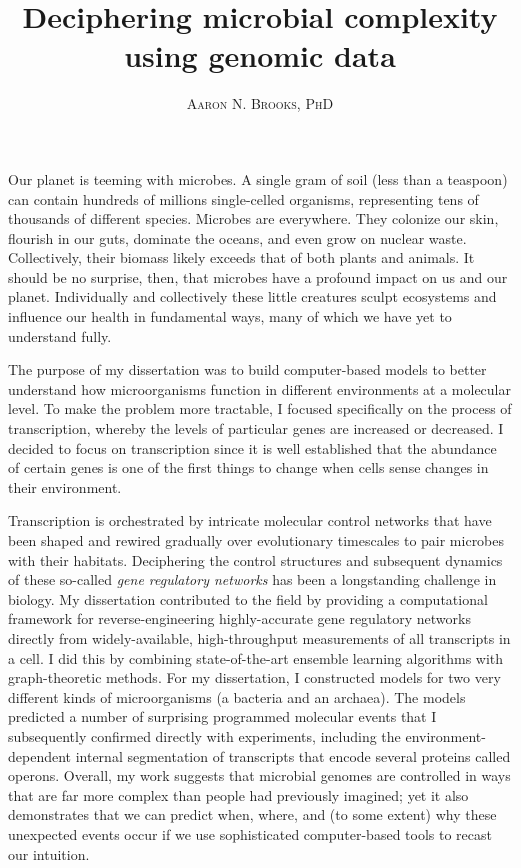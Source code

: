 \documentclass{article}
\title{\vspace{-15mm}\fontsize{20pt}{10pt}\selectfont\textbf{Deciphering microbial complexity using genomic data}} %
\author{
\large
{\textsc{ Aaron N. Brooks, PhD }}\\[0.1mm]
}
\date{}
\begin{document}
\maketitle %
\thispagestyle{fancy} %

Our planet is teeming with microbes. A single gram of soil (less than a teaspoon) can contain hundreds of millions single-celled organisms, representing tens of thousands of different species. Microbes are everywhere. They colonize our skin, flourish in our guts, dominate the oceans, and even grow on nuclear waste. Collectively, their biomass likely exceeds that of both plants and animals. It should be no surprise, then, that microbes have a profound impact on us and our planet. Individually and collectively these little creatures sculpt ecosystems and influence our health in fundamental ways, many of which we have yet to understand fully. 

The purpose of my dissertation was to build computer-based models to better understand how microorganisms function in different environments at a molecular level. To make the problem more tractable, I focused specifically on the process of transcription, whereby the levels of particular genes are increased or decreased. I decided to focus on transcription since it is well established that the abundance of certain genes is one of the first things to change when cells sense changes in their environment. 

Transcription is orchestrated by intricate molecular control networks that have been shaped and rewired gradually over evolutionary timescales to pair microbes with their habitats. Deciphering the control structures and subsequent dynamics of these so-called \textit{gene regulatory networks} has been a longstanding challenge in biology. My dissertation contributed to the field by providing a computational framework for reverse-engineering highly-accurate gene regulatory networks directly from widely-available, high-throughput measurements of all transcripts in a cell. I did this by combining state-of-the-art ensemble learning algorithms with graph-theoretic methods. For my dissertation, I constructed models for two very different kinds of microorganisms (a bacteria and an archaea).  The models predicted a number of surprising programmed molecular events that I subsequently confirmed directly with experiments, including the environment-dependent internal segmentation of transcripts that encode several proteins called operons. Overall, my work suggests that microbial genomes are controlled in ways that are far more complex than people had previously imagined; yet it also demonstrates that we can predict when, where, and (to some extent) why these unexpected events occur if we use sophisticated computer-based tools to recast our intuition. 
\end{document}
